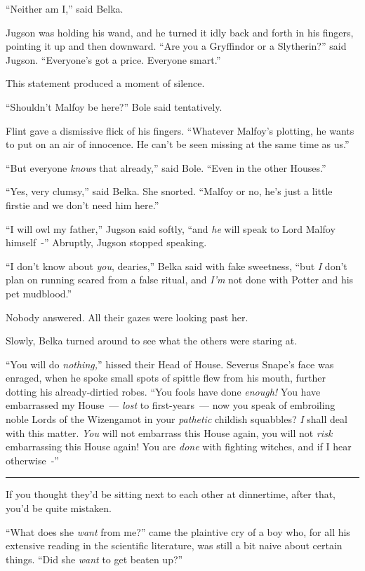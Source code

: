 ``Neither am I,'' said Belka.

Jugson was holding his wand, and he turned it idly back and forth in his fingers, pointing it up and then downward. ``Are you a Gryffindor or a Slytherin?'' said Jugson. ``Everyone's got a price. Everyone smart.''

This statement produced a moment of silence.

``Shouldn't Malfoy be here?'' Bole said tentatively.

Flint gave a dismissive flick of his fingers. ``Whatever Malfoy's plotting, he wants to put on an air of innocence. He can't be seen missing at the same time as us.''

``But everyone \emph{knows} that already,'' said Bole. ``Even in the other Houses.''

``Yes, very clumsy,'' said Belka. She snorted. ``Malfoy or no, he's just a little firstie and we don't need him here.''

``I will owl my father,'' Jugson said softly, ``and \emph{he} will speak to Lord Malfoy himself~-'' Abruptly, Jugson stopped speaking.

``I don't know about \emph{you}, dearies,'' Belka said with fake sweetness, ``but \emph{I} don't plan on running scared from a false ritual, and \emph{I'm} not done with Potter and his pet mudblood.''

Nobody answered. All their gazes were looking past her.

Slowly, Belka turned around to see what the others were staring at.

``You will do \emph{nothing,}'' hissed their Head of House. Severus Snape's face was enraged, when he spoke small spots of spittle flew from his mouth, further dotting his already-dirtied robes. ``You fools have done \emph{enough!} You have embarrassed my House~--- \emph{lost} to first-years~--- now you speak of embroiling noble Lords of the Wizengamot in your \emph{pathetic} childish squabbles? \emph{I} shall deal with this matter. \emph{You} will not embarrass this House again, you will not \emph{risk} embarrassing this House again! You are \emph{done} with fighting witches, and if I hear otherwise~-''

\begin{center}\rule{3in}{0.4pt}\end{center}

If you thought they'd be sitting next to each other at dinnertime, after that, you'd be quite mistaken.

``What does she \emph{want} from me?'' came the plaintive cry of a boy who, for all his extensive reading in the scientific literature, was still a bit naive about certain things. ``Did she \emph{want} to get beaten up?''

